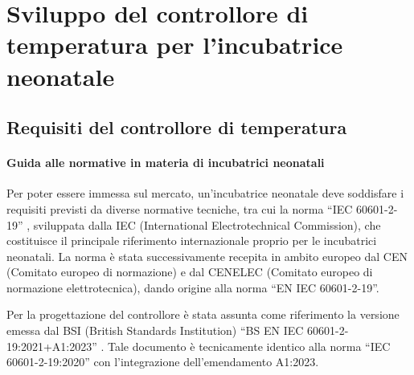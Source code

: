 \chapter{Sviluppo del controllore di temperatura per l'incubatrice neonatale}
\section{Requisiti del controllore di temperatura}
\subsubsection{Guida alle normative in materia di incubatrici neonatali}
Per poter essere immessa sul mercato, un’incubatrice neonatale deve soddisfare i requisiti previsti da diverse normative
tecniche, tra cui la norma ``IEC 60601-2-19'' \cite{iec_60601_2_19}, sviluppata dalla IEC (International Electrotechnical
Commission), che costituisce il principale riferimento internazionale proprio per le incubatrici neonatali. La norma è stata
successivamente recepita in ambito europeo dal CEN (Comitato europeo di normazione) e dal CENELEC (Comitato europeo di
normazione elettrotecnica), dando origine alla norma ``EN IEC 60601-2-19''.

Per la progettazione del controllore è stata assunta come riferimento la versione emessa dal BSI (British Standards
Institution) ``BS EN IEC 60601-2-19:2021+A1:2023'' \cite{bs_60601_2_19}. Tale documento è tecnicamente identico alla
norma ``IEC 60601-2-19:2020'' con l'integrazione dell'emendamento A1:2023.

